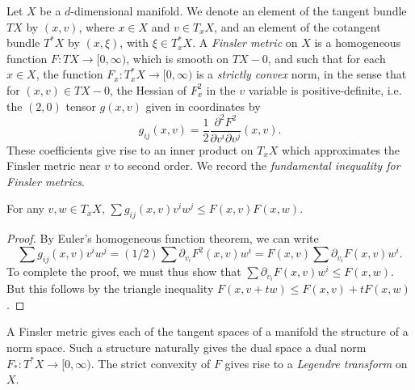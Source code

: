 Let $X$ be a $d$-dimensional manifold. We denote an element of the tangent bundle $TX$ by $(x,v)$, where $x \in X$ and $v \in T_x X$, and an element of the cotangent bundle $T^*X$ by $(x,\xi)$, with $\xi \in T_x^* X$. A \emph{Finsler metric} on $X$ is a homogeneous function $F: T X \to [0,\infty)$, which is smooth on $TX - 0$, and such that for each $x \in X$, the function $F_x: T^*_x X \to [0,\infty)$ is a \emph{strictly convex} norm, in the sense that for $(x,v) \in TX - 0$, the Hessian of $F_x^2$ in the $v$ variable is positive-definite, i.e. the $(2,0)$ tensor $g(x,v)$ given in coordinates by
%
\begin{equation} \label{FinslerMetricCoefficients}
    g_{ij}(x,v) = \frac{1}{2} \frac{\partial^2 F^2}{\partial v^i \partial v^j}(x,v).
\end{equation}
%
These coefficients give rise to an inner product on $T_x X$ which approximates the Finsler metric near $v$ to second order. We record the \emph{fundamental inequality for Finsler metrics}.

\begin{lemma}
  For any $v,w \in T_x X$, $\sum g_{ij}(x,v) v^i w^j \leq F(x,v) F(x,w)$.
\end{lemma}
\begin{proof}
  By Euler's homogeneous function theorem, we can write
  \begin{equation}
    \sum g_{ij}(x,v) v^i w^j = (1/2) \sum \partial_{v_i} F^2(x,v) w^i = F(x,v) \sum \partial_{v_i} F(x,v) w^i.
  \end{equation}
  To complete the proof, we must thus show that $\sum \partial_{v_i} F(x,v) w^i \leq F(x,w)$. But this follows by the triangle inequality $F(x,v + tw) \leq F(x,v) + t F(x,w)$.
\end{proof}

A Finsler metric gives each of the tangent spaces of a manifold the structure of a norm space. Such a structure naturally gives the dual space a dual norm $F_*: T^* X \to [0,\infty)$. The strict convexity of $F$ gives rise to a \emph{Legendre transform} on $X$.

